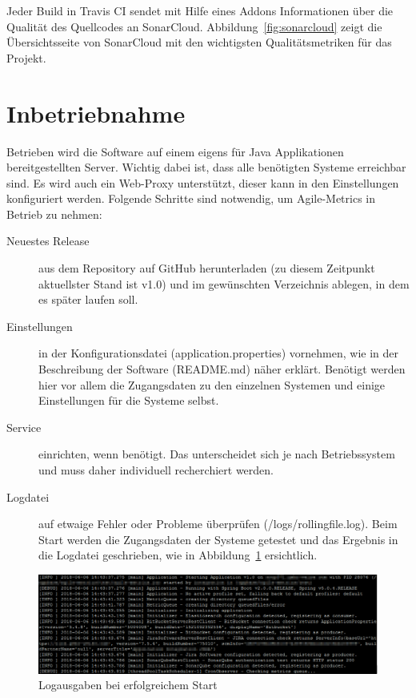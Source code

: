 Jeder Build in Travis CI sendet mit Hilfe eines Addons Informationen über die Qualität des Quellcodes an SonarCloud.
Abbildung~\ref{fig:sonarcloud} zeigt die Übersichtsseite von SonarCloud mit den wichtigsten Qualitätsmetriken für das Projekt.

\newpage
\section{Inbetriebnahme}

Betrieben wird die Software auf einem eigens für Java Applikationen bereitgestellten Server. 
Wichtig dabei ist, dass alle benötigten Systeme erreichbar sind. 
Es wird auch ein Web-Proxy unterstützt, dieser kann in den Einstellungen konfiguriert werden.
Folgende Schritte sind notwendig, um Agile-Metrics in Betrieb zu nehmen:
\begin{description}
    \item[Neuestes Release] aus dem Repository auf GitHub herunterladen (zu diesem Zeitpunkt aktuellster Stand ist v1.0) und im gewünschten Verzeichnis ablegen, in dem es später laufen soll.
    \item[Einstellungen] in der Konfigurationsdatei (application.properties) vornehmen, wie in der Beschreibung der Software (README.md) näher erklärt. Benötigt werden hier vor allem die Zugangsdaten zu den einzelnen Systemen und einige Einstellungen für die Systeme selbst.
    \item[Service] einrichten, wenn benötigt. Das unterscheidet sich je nach Betriebssystem und muss daher individuell recherchiert werden.
    \item[Logdatei] auf etwaige Fehler oder Probleme überprüfen (/logs/rollingfile.log). Beim Start werden die Zugangsdaten der Systeme getestet und das Ergebnis in die Logdatei geschrieben, wie in Abbildung~\ref{fig:successful-start} ersichtlich.
\end{description}

\begin{savenotes}
    \begin{figure}[H] 
        \centering
            \includegraphics[width=1.0\textwidth]{img/successful-start.png}
        \caption{Logausgaben bei erfolgreichem Start}\label{fig:successful-start}
    \end{figure}
\end{savenotes}

